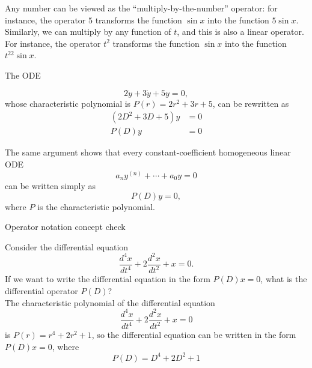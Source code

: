 Any number can be viewed as the ``multiply-by-the-number'' operator:
for instance, the operator $5$ transforms the function $\sin ⁡x$ into the function $5 \sin ⁡x$.\\

Similarly, we can multiply by any function of $t$, and this is also a linear operator.
For instance, the operator $t^2$ transforms the function $\sin ⁡x$ into the function $t ^22 \sin⁡ x$.

\begin{example}
  The ODE
\end{example}
\begin{equation*}
  2 \ddot{y} + 3 \dot{y} + 5 y = 0,
\end{equation*}
whose characteristic polynomial is $P(r) = 2r^2+3r+5$, can be rewritten as
\begin{align*}
  (2D^2 + 3D + 5) y &= 0\\
  P(D) y &= 0 
\end{align*}

The same argument shows that every constant-coefficient homogeneous linear ODE
\begin{equation*}
  a_ n y^{(n)} + \cdots + a_0 y = 0
\end{equation*}
can be written simply as
\begin{equation*}
  P(D) y = 0,
\end{equation*}
where $P$ is the characteristic polynomial.

\begin{exercise}
  Operator notation concept check
\end{exercise}
Consider the differential equation
\begin{equation*}
  \displaystyle  \frac{d^4x}{dt^4}+2\frac{d^2x}{dt^2}+x=0.
\end{equation*}
If we want to write the differential equation in the form
$P\left(D\right)x=0$, what is the differential operator $P\left(D\right)$?\\

The characteristic polynomial of the differential equation
\begin{equation*}
  \displaystyle  \frac{d^4x}{dt^4}+2\frac{d^2x}{dt^2}+x=0
\end{equation*}
is $P\left(r\right)=r^4+2r^2+1$, so the differential equation can be written in the form
$P\left(D\right) x = 0$, where
\begin{equation*}
  \displaystyle  P\left(D\right)=D^4+2D^2+1
\end{equation*}

